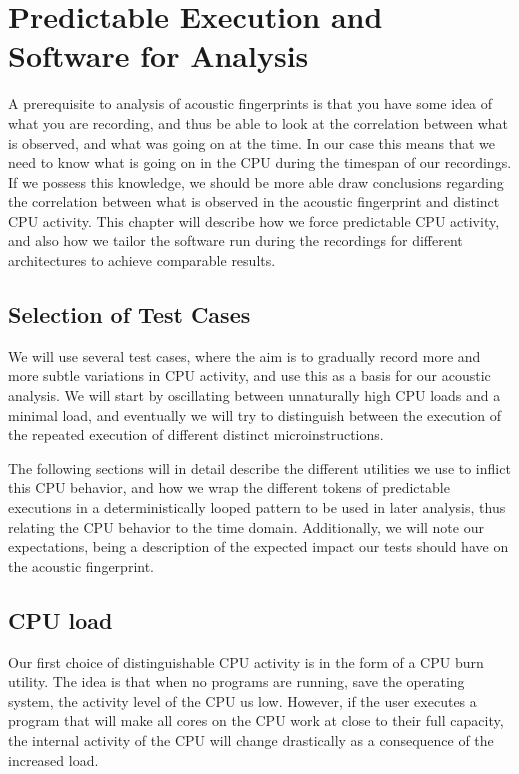 \chapter{Predictable Execution and Software for Analysis}\label{chp:predictable_execution} 
A prerequisite to analysis of acoustic fingerprints is that you have some idea of what you are recording, and thus be able to look at the correlation between what is observed, and what was going on at the time.
In our case this means that we need to know what is going on in the CPU during the timespan of our recordings.
If we possess this knowledge, we should be more able draw conclusions regarding the correlation between what is observed in the acoustic fingerprint and distinct CPU activity.
This chapter will describe how we force predictable CPU activity, and also how we tailor the software run during the recordings for different architectures to achieve comparable results.

\section{Selection of Test Cases}
We will use several test cases, where the aim is to gradually record more and more subtle variations in CPU activity, and use this as a basis for our acoustic analysis.
We will start by oscillating between unnaturally high CPU loads and a minimal load, and eventually we will try to distinguish between the execution of the repeated execution of different distinct microinstructions.

The following sections will in detail describe the different utilities we use to inflict this CPU behavior, and how we wrap the different tokens of predictable executions in a deterministically looped pattern to be used in later analysis, thus relating the CPU behavior to the time domain. 
Additionally, we will note our expectations, being a description of the expected impact our tests should have on the acoustic fingerprint.


\section{CPU load}\label{chp4:cpu_load}

Our first choice of distinguishable CPU activity is in the form of a CPU burn utility. 
The idea is that when no programs are running, save the operating system, the activity level of the CPU us low. 
However, if the user executes a program that will make all cores on the CPU work at close to their full capacity, the internal activity of the CPU will change drastically as a consequence of the increased load.

